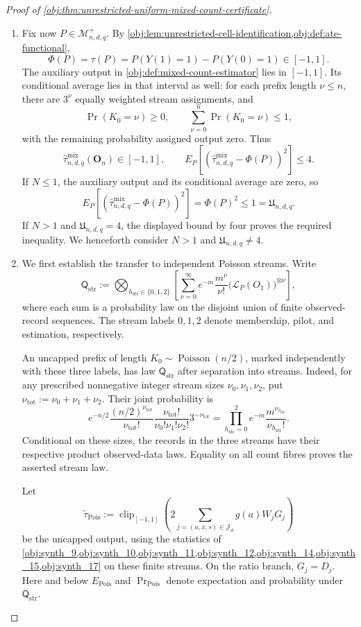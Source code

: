\documentclass[11pt]{article}
\begin{document}
\begin{proof}[Proof of \cref{obj:thm:unrestricted-uniform-mixed-count-certificate}]
\begin{enumerate}
\item Fix now \(P\in\mathcal M^+_{n,d,q}\). By
\cref{obj:lem:unrestricted-cell-identification,obj:def:ate-functional},
\[
\Phi(P)=\tau(P)
=P(Y(1)=1)-P(Y(0)=1)\in[-1,1].
\]
The auxiliary output in \cref{obj:def:mixed-count-estimator} lies in
\([-1,1]\). Its conditional average lies in that interval as well: for each
prefix length \(\nu\le n\), there are \(3^\nu\) equally weighted stream
assignments, and
\[
\Pr(K_0=\nu)\ge0,
\qquad
\sum_{\nu=0}^{n}\Pr(K_0=\nu)\le1,
\]
with the remaining probability assigned output zero. Thus
\[
\widehat\tau^{\mathrm{mix}}_{n,d,q}(\mathbf O_n)\in[-1,1],
\qquad
E_P\!\left[
(\widehat\tau^{\mathrm{mix}}_{n,d,q}-\Phi(P))^2
\right]\le4.
\]
If \(N\le1\), the auxiliary output and its conditional average are zero, so
\[
E_P\!\left[
(\widehat\tau^{\mathrm{mix}}_{n,d,q}-\Phi(P))^2
\right]=\Phi(P)^2\le1=\mathfrak U_{n,d,q}.
\]
If \(N>1\) and \(\mathfrak U_{n,d,q}=4\), the displayed bound by four proves
the required inequality. We henceforth consider
\(N>1\) and \(\mathfrak U_{n,d,q}\ne4\).

\item We first establish the transfer to independent Poisson streams.
Write
\[
\mathsf Q_{\mathrm{str}}
:=
\bigotimes_{h_{\mathrm{str}}\in\{0,1,2\}}
\left[
\sum_{\nu=0}^{\infty}
e^{-m}\frac{m^\nu}{\nu!}
\bigl(\mathcal L_P(O_1)\bigr)^{\otimes\nu}
\right],
\]
where each sum is a probability law on the disjoint union of finite
observed-record sequences. The stream labels \(0,1,2\) denote membership,
pilot, and estimation, respectively.

An uncapped prefix of length \(K_0\sim\operatorname{Poisson}(n/2)\), marked
independently with these three labels, has law \(\mathsf Q_{\mathrm{str}}\)
after separation into streams. Indeed, for any prescribed nonnegative
integer stream sizes \(\nu_0,\nu_1,\nu_2\), put
\(\nu_{\mathrm{tot}}:=\nu_0+\nu_1+\nu_2\). Their joint probability is
\[
e^{-n/2}\frac{(n/2)^{\nu_{\mathrm{tot}}}}{\nu_{\mathrm{tot}}!}
\frac{\nu_{\mathrm{tot}}!}{\nu_0!\nu_1!\nu_2!}
3^{-\nu_{\mathrm{tot}}}
=
\prod_{h_{\mathrm{str}}=0}^{2}
e^{-m}\frac{m^{\nu_{h_{\mathrm{str}}}}}
{\nu_{h_{\mathrm{str}}}!}.
\]
Conditional on these sizes, the records in the three streams have their
respective product observed-data laws. Equality on all count fibres proves
the asserted stream law.

Let
\[
\widetilde\tau_{\mathrm{Pois}}
:=
\operatorname{clip}_{[-1,1]}
\left(2\sum_{j=(a,x,s)\in\mathcal J_d}g(a)W_jG_j\right)
\]
be the uncapped output, using the statistics of
\cref{obj:synth_9,obj:synth_10,obj:synth_11,obj:synth_12,obj:synth_14,obj:synth_15,obj:synth_17}
on these finite streams. On the ratio branch, \(G_j=D_j\).
Here and below \(E_{\mathrm{Pois}}\) and
\(\Pr_{\mathrm{Pois}}\) denote expectation and probability under
\(\mathsf Q_{\mathrm{str}}\).


\end{enumerate}
\end{proof}
\end{document}
